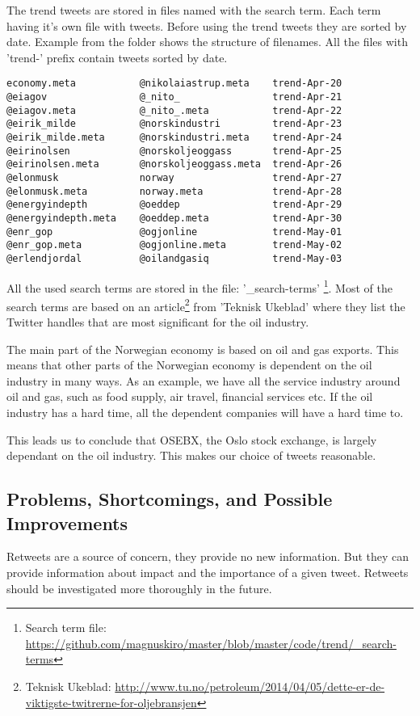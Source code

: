 The trend tweets are stored in files named with the search term. Each term
having it's own file with tweets. Before using the trend tweets they are sorted
by date. Example from the folder shows the structure of filenames. All the files
with 'trend-' prefix contain tweets sorted by date.   
\begin{verbatim}
economy.meta           @nikolaiastrup.meta    trend-Apr-20
@eiagov                @_nito_                trend-Apr-21
@eiagov.meta           @_nito_.meta           trend-Apr-22
@eirik_milde           @norskindustri         trend-Apr-23
@eirik_milde.meta      @norskindustri.meta    trend-Apr-24
@eirinolsen            @norskoljeoggass       trend-Apr-25
@eirinolsen.meta       @norskoljeoggass.meta  trend-Apr-26
@elonmusk              norway                 trend-Apr-27
@elonmusk.meta         norway.meta            trend-Apr-28
@energyindepth         @oeddep                trend-Apr-29
@energyindepth.meta    @oeddep.meta           trend-Apr-30
@enr_gop               @ogjonline             trend-May-01
@enr_gop.meta          @ogjonline.meta        trend-May-02
@erlendjordal          @oilandgasiq           trend-May-03
\end{verbatim}

All the used search terms are stored in the file: '\_search-terms'
\footnote{Search term file:
\url{https://github.com/magnuskiro/master/blob/master/code/trend/_search-terms}}.
Most of the search terms are based on an article\footnote{Teknisk Ukeblad:
\url{http://www.tu.no/petroleum/2014/04/05/dette-er-de-viktigste-twitrerne-for-oljebransjen}}
from 'Teknisk Ukeblad' where they list the Twitter handles that are most
significant for the oil industry.

The main part of the Norwegian economy is based on oil and gas exports. This
means that other parts of the Norwegian economy is dependent on the oil
industry in many ways. As an example, we have all the service industry around
oil and gas, such as food supply, air travel, financial services etc. If the
oil industry has a hard time, all the dependent companies will have a hard time
to. 
 
This leads us to conclude that OSEBX, the Oslo stock exchange, is largely
dependant on the oil industry. This makes our choice of tweets
reasonable. 
%

\subsection{Problems, Shortcomings, and Possible Improvements}
Retweets are a source of concern, they provide no new information. But they can
provide information about impact and the importance of a given tweet. Retweets
should be investigated more thoroughly in the future.  

